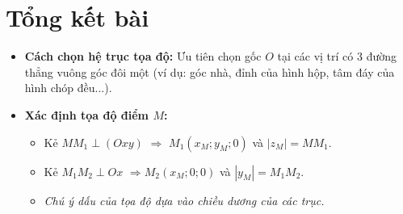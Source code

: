 \documentclass[12pt]{article}
\begin{document}
	
	\newpage
	\section{Tổng kết bài}
	
	\begin{tcolorbox}[colback=yellow!10!white, colframe=orange!60!black,
		fonttitle=\bfseries, title={Kiến thức trọng tâm cần nhớ}]
		\begin{itemize}
			\item \textbf{Cách chọn hệ trục tọa độ:} Ưu tiên chọn gốc $O$ tại các vị trí có 3 đường thẳng vuông góc đôi một (ví dụ: góc nhà, đỉnh của hình hộp, tâm đáy của hình chóp đều...).
			\item \textbf{Xác định tọa độ điểm $M$:} 
			\begin{itemize}
				\item Kẻ $M M_1 \perp (Oxy)$ $\Rightarrow$ $M_1(x_M; y_M; 0)$ và $|z_M| = MM_1$.
				\item Kẻ $M_1 M_2 \perp Ox$ $\Rightarrow M_2(x_M; 0; 0)$ và $|y_M| = M_1 M_2$.
				\item \textit{Chú ý dấu của tọa độ dựa vào chiều dương của các trục.}
			\end{itemize}
		\end{itemize}
	\end{tcolorbox}

	
\end{document}
